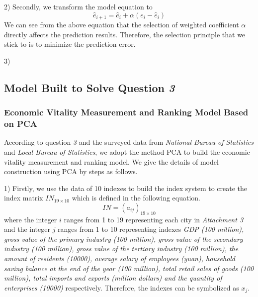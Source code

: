 \documentclass{apmcmthesis}
\begin{document}
2) Secondly, we transform the model equation to
\begin{equation}
{{\hat{e}}_{i+1}}={{\hat{e}}_{i}}+\alpha ({{e}_{i}}-{{\hat{e}}_{i}})
\end{equation}
We can see from the above equation that the selection of weighted coefficient $\alpha$ directly affects the prediction results. Therefore, the selection principle that we stick to is to minimize the prediction error. 

3)

\subsection{Model Built to Solve Question \textit 3}
\subsubsection{Economic Vitality Measurement and Ranking Model Based on PCA}
\hspace{2em}According to question \textit 3 and the surveyed data from \textit{National Bureau of Statistics} and \textit{Local Bureau of Statistics}, we adopt the method PCA to build the economic vitality measurement and ranking model. We give the details of model construction using PCA by steps as follows.

1) Firstly, we use the data of 10 indexes to build the index system to create the index matrix ${{IN}_{19\times 10}}$ which is defined in the following equation.
\begin{equation}
IN=(a_{ij})_{19\times 10}
\end{equation}
where the integer $i$ ranges from 1 to 19 representing each city in \textit {Attachment 3} and the integer $j$ ranges from 1 to 10 representing indexes \textit{GDP (100 million), gross value of the primary industry (100 million), gross value of the secondary industry (100 million), gross value of the tertiary industry (100 million), the amount of residents (10000), average salary of employees (yuan), household saving balance at the end of the year (100 million), total retail sales of goods (100 million), total imports and exports (million dollars) and the quantity of enterprises (10000)} respectively. Therefore, the indexes can be symbolized as $x_j$.
\end{document}
